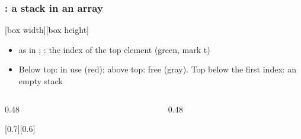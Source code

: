 \documentclass[aspectratio=169,10pt,compress]{beamer}
\begin{document}
\begin{frame}[t,fragile] \frametitle{: a stack in an array}

\begin{texcode}
[box width][box height]   %
\end{texcode}

	\begin{itemize}\footnotesize
		\item {} as in ; : the index of the top element (green, mark t)
		\item Below top: in use (red); above top: free (gray). Top below the first index: an empty stack
	\end{itemize}

	\begin{columns}[T]
		\begin{column}{0.48\textwidth}

\begin{texcode}
[0.7][0.6]
\end{texcode}

			\begin{center}
				\\[6pt]
			\end{center}
		\end{column}
		\begin{column}{0.48\textwidth}

\begin{texcode}
\end{texcode}

			\begin{center}

				\footnotesize {}
			\end{center}
		\end{column}
	\end{columns}
\end{frame}
\end{document}

